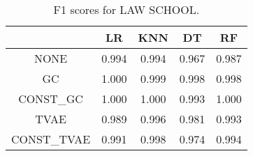 \begin{table}
\caption{F1 scores for LAW SCHOOL.}
\label{tab:f1-LAW SCHOOL}
\begin{tabular}{ccccc}
\toprule
 & LR & KNN & DT & RF \\
\midrule
NONE & 0.994 & 0.994 & 0.967 & 0.987 \\
GC & 1.000 & 0.999 & 0.998 & 0.998 \\
CONST\_GC & 1.000 & 1.000 & 0.993 & 1.000 \\
TVAE & 0.989 & 0.996 & 0.981 & 0.993 \\
CONST\_TVAE & 0.991 & 0.998 & 0.974 & 0.994 \\
\bottomrule
\end{tabular}
\end{table}
